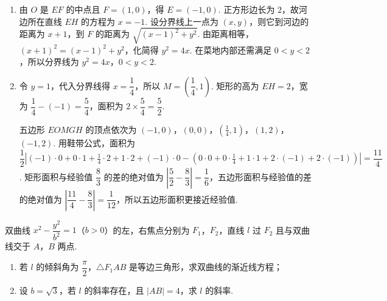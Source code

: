 \begin{solution}
\begin{enumerate}
\item 由 \(O\) 是 \(EF\) 的中点且 \(F=(1,0)\)，得 \(E=(-1,0)\). 正方形边长为 \(2\)，故河边所在直线 \(EH\) 的方程为 \(x=-1\). 设分界线上一点为 \((x,y)\)，则它到河边的距离为 \(x+1\)，到 \(F\) 的距离为 \(\sqrt{(x-1)^2+y^2}\). 由距离相等，\((x+1)^2=(x-1)^2+y^2\)，化简得 \(y^2=4x\). 在菜地内部还需满足 \(0<y<2\)，所以分界线为 \(y^2=4x\)，\(0<y<2\).
\item 令 \(y=1\)，代入分界线得 \(x=\dfrac14\)，所以 \(M=\left(\dfrac14,1\right)\). 矩形的高为 \(EH=2\)，宽为 \(\dfrac14-(-1)=\dfrac54\)，面积为 \(2\times\dfrac54=\dfrac52\).

五边形 \(EOMGH\) 的顶点依次为 \((-1,0)\)，\((0,0)\)，\((\frac14,1)\)，\((1,2)\)，\((-1,2)\). 用鞋带公式，面积为
\(\dfrac12\left|(-1)\cdot0+0\cdot1+\frac14\cdot2+1\cdot2+(-1)\cdot0-\left(0\cdot0+0\cdot\frac14+1\cdot1+2\cdot(-1)+2\cdot(-1)\right)\right|=\dfrac{11}{4}\).
矩形面积与经验值 \(\dfrac83\) 的差的绝对值为 \(\left|\dfrac52-\dfrac83\right|=\dfrac16\)，五边形面积与经验值的差的绝对值为 \(\left|\dfrac{11}{4}-\dfrac83\right|=\dfrac1{12}\)，所以五边形面积更接近经验值.
\end{enumerate}
\end{solution}

\begin{problem}
双曲线 \(x^2-\dfrac{y^2}{b^2}=1\)（\(b>0\)）的左，右焦点分别为 \(F_1\)，\(F_2\)，直线 \(l\) 过 \(F_2\) 且与双曲线交于 \(A\)，\(B\) 两点.

\begin{enumerate}
\item 若 \(l\) 的倾斜角为 \(\dfrac{\pi}{2}\)，\(\triangle F_1AB\) 是等边三角形，求双曲线的渐近线方程；
\item 设 \(b=\sqrt3\)，若 \(l\) 的斜率存在，且 \(|AB|=4\)，求 \(l\) 的斜率.
\end{enumerate}
\end{problem}

